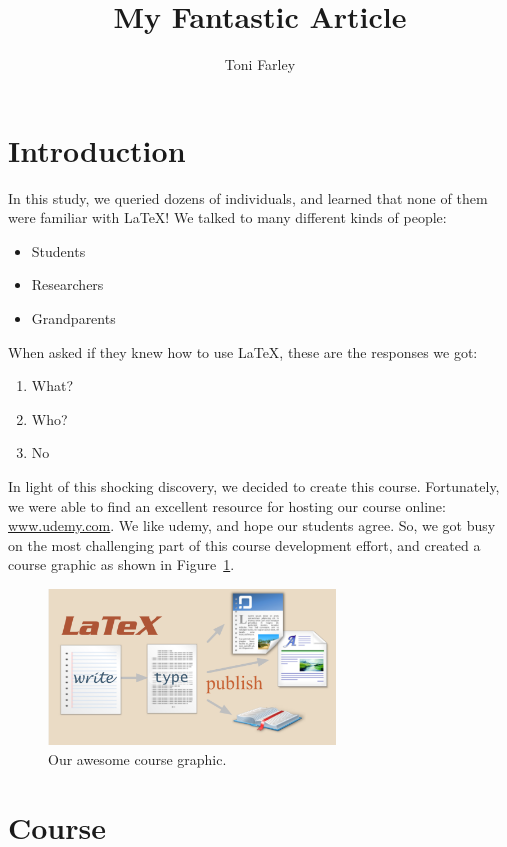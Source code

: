 \documentclass{article}
\title{My Fantastic Article}
\author{Toni Farley}
\date{}
\begin{document}
\maketitle

\section{Introduction}

In this study, we queried dozens of individuals, and learned that none of them were familiar with \LaTeX!  We talked to many different kinds of people:

\begin{itemize}
\item Students
\item Researchers
\item Grandparents
\end{itemize}

\noindent When asked if they knew how to use \LaTeX, these are the responses we got:

\begin{enumerate}
\item What?
\item Who?
\item No
\end{enumerate}

In light of this shocking discovery, we decided to create this course. Fortunately, we were able to find an excellent resource for hosting our course online: \url{www.udemy.com}. We like udemy, and hope our students agree. So, we got busy on the most challenging part of this course development effort, and created a course graphic as shown in Figure~\ref{fig:course}.

\begin{figure}[htbp]
\begin{center}
\includegraphics[width=3in]{course_graphic}
\caption{Our awesome course graphic.}
\label{fig:course}
\end{center}
\end{figure}

\section{Course}
\end{document}
